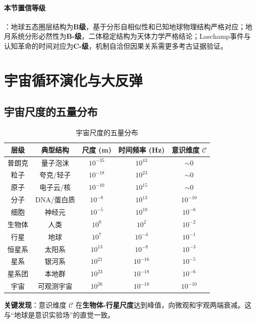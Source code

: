 \documentclass[12pt,a4paper,twocolumn]{article}
\begin{document}
\paragraph{本节置信等级}：地球五态圈层结构为\textbf{B级}，基于分形自相似性和已知地球物理结构严格对应；地月系统分形必然性为\textbf{B-级}，二体稳定结构为天体力学严格结论；Laschamp事件与认知革命的时间对应为\textbf{C-级}，机制自洽但因果关系需更多考古证据验证。

\section{宇宙循环演化与大反弹}
\label{sec:cosmic_cycle}

\subsection{宇宙尺度的五量分布}

\begin{table}[H]
\centering
\footnotesize
\caption{宇宙尺度的五量分布}
\begin{tabular}{c|c|c|c|c}
\hline
\textbf{层级} & \textbf{典型结构} & \textbf{尺度 (m)} & \textbf{时间频率 (Hz)} & \textbf{意识维度 $\mathcal{C}$} \\
\hline
普朗克 & 量子泡沫 & $10^{-35}$ & $10^{43}$ & $\sim 0$ \\
粒子 & 夸克/轻子 & $10^{-18}$ & $10^{23}$ & $\sim 0$ \\
原子 & 电子云/核 & $10^{-10}$ & $10^{15}$ & $\sim 0$ \\
分子 & DNA/蛋白质 & $10^{-8}$ & $10^{13}$ & $10^{-10}$ \\
细胞 & 神经元 & $10^{-5}$ & $10^{10}$ & $10^{-6}$ \\
生物体 & 人类 & $10^{0}$ & $10^{2}$ & $10^{-2}$ \\
行星 & 地球 & $10^{7}$ & $10^{-4}$ & $10^{-1}$ \\
恒星系 & 太阳系 & $10^{13}$ & $10^{-8}$ & $10^{-3}$ \\
星系 & 银河系 & $10^{21}$ & $10^{-16}$ & $10^{-5}$ \\
星系团 & 本地群 & $10^{23}$ & $10^{-18}$ & $10^{-6}$ \\
宇宙 & 可观测宇宙 & $10^{26}$ & $10^{-18}$ & $10^{-10}$ \\
\hline
\end{tabular}
\end{table}

\textbf{关键发现}：意识维度 $\mathcal{C}$ 在\textbf{生物体-行星尺度}达到峰值，向微观和宇观两端衰减。这与``地球是意识实验场''的直觉一致。
\end{document}

